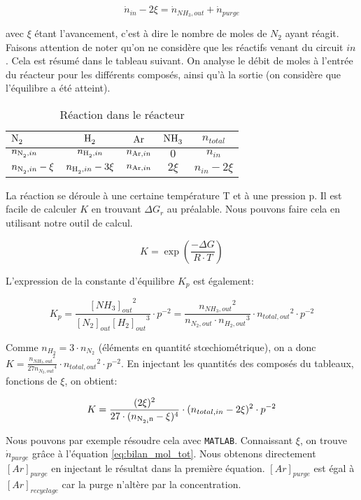 \documentclass[a4paper, oneside, 12pt]{article}
\begin{document}
\begin{equation}
	\dot{n}_{in} - 2\xi=\dot{n}_{NH_3,out} + \dot{n}_{purge}
	\label{eq:bilan_mol_tot}
\end{equation}

avec $\xi$ étant l'avancement, c'est à dire le nombre de moles de $N_2$ ayant réagit. 
Faisons attention de noter qu'on ne considère que les réactifs venant du circuit $in$. 
Cela est résumé dans le tableau suivant. 
On analyse le débit de moles à l'entrée du réacteur pour les différents composés, 
ainsi qu'à la sortie (on considère que l'équilibre a été atteint).

\begin{table}
	\centering
	\begin{tabular}{l|c|c|c|c}
		$\ce{N2}$ & $\ce{H2}$ & $\ce{Ar}$ & $\ce{NH3}$ & $n_{total}$ \\
		\hline
		$n_{\ce{N2},in}$ & $n_{\ce{H2},in}$ & $n_{\ce{Ar},in}$ & $0$  & $n_{in}$\\
		$n_{\ce{N2},in}-\xi$ & $n_{\ce{H2},in}-3\xi$ & $n_{\ce{Ar},in}$ & $2\xi$  & $n_{in}-2\xi$\\
	\end{tabular}
	\caption{Réaction dans le réacteur}
	\label{tab:reaction1_primaire}
\end{table}

La réaction se déroule à une certaine température T et à une pression p. 
Il est facile de calculer $K$ en trouvant $\Delta G_{r}$ au préalable. 
Nous pouvons faire cela en utilisant notre outil de calcul.

\[
K=\exp(\frac{-\Delta G}{R \cdot T})\]

L'expression de la constante d'équilibre $K_p$ est également: 

\[
K_p=\frac{{[NH_3]_{out}}^2}{[N_2]_{out}{[H_2]_{out}}^3} \cdot p^{-2} = 
\frac{{n_{NH_3,out}}^2}{n_{N_2,out}\cdot {n_{H_2,out}}^3}\cdot {n_{total,out}}^2\cdot p^{-2}
\]

Comme $n_{H_2}=3\cdot n_{N_2}$ (éléments en quantité stœchiométrique), on a donc 
$K=\frac{{n_{NH_3,out}}^2}{27{n_{N_2,out}}^4}\cdot {n_{total,out}}^2\cdot p^{-2}$. En injectant les 
quantités des composés du tableaux, fonctions de $\xi$, on obtient:

\[ K=\frac{({2\xi})^2}{27 \cdot ({{n_{\ce{N2,in}}-\xi})^4}}\cdot ({n_{total,in}-2\xi})^2 \cdot p^{-2} \]

Nous pouvons par exemple résoudre cela avec \texttt{MATLAB}. 
Connaissant $\xi$, on trouve $\dot{n}_{purge}$ grâce à l'équation \ref{eq:bilan_mol_tot}. 
Nous obtenons directement $[Ar]_{purge}$ en injectant 
le résultat dans la première équation. $[Ar]_{purge}$ est égal à $[Ar]_{recyclage}$ 
car la purge n'altère par la concentration.
\end{document}
